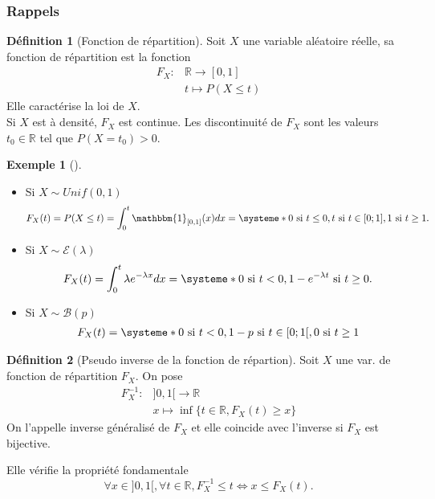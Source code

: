 \documentclass{article}
\theoremstyle{plain}%
\theoremstyle{definition}
\newtheorem{defn}{Définition}[section]
\newtheorem{exmp}{Exemple}[section]
\theoremstyle{remark}
\begin{document}
\subsubsection{Rappels}
\begin{defn}[Fonction de répartition]
    Soit $ X $ une variable aléatoire réelle, sa fonction de répartition est la fonction \begin{align*}
        F_X :& \mathbb{R} \to [0,1] \\
            & t \mapsto P(X \leq t)
    \end{align*}
    Elle caractérise la loi de $ X $. \\
    Si $ X $ est à densité, $ F_X $ est continue. Les discontinuité de $ F_X $ sont les valeurs $ t_0 \in \mathbb{R} $ tel que $ P(X = t_0) > 0 $. 
    \begin{exmp}[]
        \begin{itemize}
            \item Si $ X \sim Unif({0,1}) $ 
                \[
                    F_X(t) = P(X \leq t) = \int_{0}^{t} \mathbbm{1}_{[0,1]}(x)dx = \systeme*{
                        0 \text{ si } t \leq 0,
                        t \text{ si } t \in [0;1],
                        1 \text{ si } t \geq 1
                    }
                .\]
            \item Si $ X \sim \mathcal{E}(\lambda ) $ 
            \[
                F_X(t) = \int_{0}^{t}\lambda e^{-\lambda x}dx = \systeme*{
                    0 \text{ si } t < 0,
                    1 - e^{- \lambda t} \text{ si } t \geq 0
                }
            .\]
            \item Si $ X \sim \mathcal{B}(p) $ 
            \begin{align*}
                F_X(t) = \systeme*{
                    0 \text{ si } t<0,
                    {1-p} \text{ si } t \in [0;1[,
                    0 \text{ si } t \geq 1
                }
            \end{align*}
        \end{itemize}
    \end{exmp}
\end{defn}

\begin{defn}[Pseudo inverse de la fonction de répartion]
    Soit $ X $ une var. de fonction de répartition $ F_X $. On pose 
    \begin{align*}
        F_X^{-1} :& ]0,1[ \to \mathbb{R} \\
                &x \mapsto \inf \{t \in \mathbb{R}, F_X (t) \geq x\}
    \end{align*}
    On l'appelle inverse généralisé de $ F_X $ et elle coincide avec l'inverse si $ F_X $ est bijective.

    Elle vérifie la propriété fondamentale 
    \[
        \forall x \in ]0,1[, \forall t \in \mathbb{R}, F_X^{-1} \leq t \Leftrightarrow x \leq F_X(t)
    .\]
\end{defn}
\end{document}
